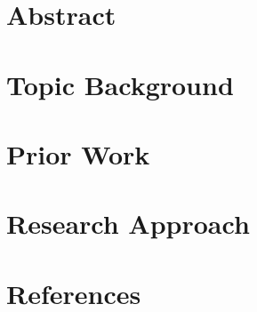 \documentclass[12pt,letterpaper]{article}          %
\begin{document}


\section{Abstract}


\section{Topic Background}


\section{Prior Work}


\section{Research Approach}


\section{References}

\end{document}

